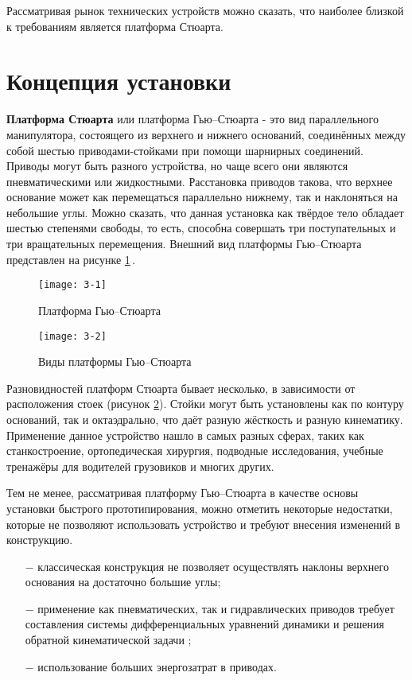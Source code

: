 Рассматривая рынок технических устройств можно сказать, что наиболее близкой к требованиям является платформа Стюарта.

\section {Концепция установки}

{\bf Платформа Стюарта} или платформа Гью–Стюарта - это вид параллельного манипулятора, состоящего из верхнего и нижнего оснований, соединённых между собой шестью приводами-стойками при помощи шарнирных соединений. Приводы могут быть разного устройства, но чаще всего они являются пневматическими или жидкостными. Расстановка приводов такова, что верхнее основание может как перемещаться параллельно нижнему, так и наклоняться на небольшие углы. Можно сказать, что данная установка как твёрдое тело обладает шестью степенями свободы, то есть, способна совершать три поступательных и три вращательных перемещения. Внешний вид платформы Гью–Стюарта представлен на рисунке \ref{f:pic7}\,\cite{stewart0}.

\begin{figure} [h]
	\centering
	\texttt{[image: 3-1]}
	\caption{Платформа Гью–Стюарта}
	\label{f:pic7}
\end{figure}

\begin{figure} [h]
	\centering
	\texttt{[image: 3-2]}
	\caption{Виды платформы Гью–Стюарта}
	\label{f:pic8}
\end{figure}

Разновидностей платформ Стюарта бывает несколько, в зависимости от расположения стоек (рисунок \ref{f:pic8}). Стойки могут быть установлены как по контуру оснований, так и октаэдрально, что даёт разную жёсткость и разную кинематику. Применение данное устройство нашло в самых разных сферах, таких как станкостроение, ортопедическая хирургия, подводные исследования, учебные тренажёры для водителей грузовиков и многих других.

Тем не менее, рассматривая платформу Гью–Стюарта в качестве основы установки быстрого прототипирования, можно отметить некоторые недостатки, которые не позволяют использовать устройство и требуют внесения изменений в конструкцию.

\begin{itemize}
\item[$-$] классическая конструкция не позволяет осуществлять наклоны верхнего основания на достаточно большие углы;
\item[$-$] применение как пневматических, так и гидравлических приводов требует составления системы дифференциальных уравнений динамики и решения обратной кинематической задачи \cite{stewart1};
\item[$-$] использование больших энергозатрат в приводах.
\end{itemize}

